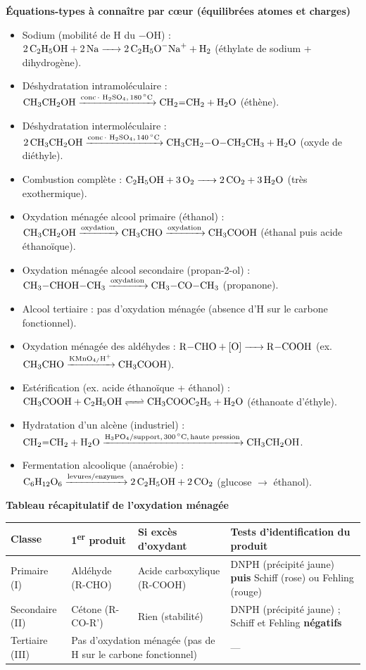 \documentclass[11pt]{article}
\begin{document}
\begin{propriete}
\textbf{Équations-types à connaître par cœur (équilibrées atomes et charges)}
\begin{itemize}
  \item Sodium (mobilité de H du $-\mathrm{OH}$) : $\ce{2C2H5OH + 2Na -> 2C2H5O^-Na^+ + H2}$ (éthylate de sodium + dihydrogène).
  \item Déshydratation intramoléculaire : $\ce{CH3CH2OH ->[{\ce{conc. H2SO4}}, \SI{180}{\celsius}] CH2=CH2 + H2O}$ (éthène).
  \item Déshydratation intermoléculaire : $\ce{2CH3CH2OH ->[{\ce{conc. H2SO4}}, \SI{140}{\celsius}] CH3CH2-O-CH2CH3 + H2O}$ (oxyde de diéthyle).
  \item Combustion complète : $\ce{C2H5OH + 3O2 -> 2CO2 + 3H2O}$ (très exothermique).
  \item Oxydation ménagée alcool primaire (éthanol) : $\ce{CH3CH2OH ->[oxydation] CH3CHO ->[oxydation] CH3COOH}$ (éthanal puis acide éthanoïque).
  \item Oxydation ménagée alcool secondaire (propan-2-ol) : $\ce{CH3-CHOH-CH3 ->[oxydation] CH3-CO-CH3}$ (propanone).
  \item Alcool tertiaire : pas d'oxydation ménagée (absence d'H sur le carbone fonctionnel).
  \item Oxydation ménagée des aldéhydes : $\ce{R-CHO + [O] -> R-COOH}$ (ex. $\ce{CH3CHO ->[KMnO4/H+] CH3COOH}$).
  \item Estérification (ex. acide éthanoïque + éthanol) : $\ce{CH3COOH + C2H5OH <=> CH3COOC2H5 + H2O}$ (éthanoate d'éthyle).
  \item Hydratation d'un alcène (industriel) : $\ce{CH2=CH2 + H2O ->[{\ce{H3PO4}/\text{support}}, \SI{300}{\celsius}, \text{haute pression}] CH3CH2OH}$.
  \item Fermentation alcoolique (anaérobie) : $\ce{C6H12O6 ->[\text{levures/enzymes}] 2C2H5OH + 2CO2}$ (glucose $\to$ éthanol).
\end{itemize}

\textbf{Tableau récapitulatif de l'oxydation ménagée}
\begin{center}
\begin{tabularx}{\linewidth}{|l|X|X|X|}
\hline
\rowcolor{popblueL} \textbf{Classe} & \textbf{1\textsuperscript{er} produit} & \textbf{Si excès d'oxydant} & \textbf{Tests d'identification du produit} \\
\hline
Primaire (I) & Aldéhyde (R-CHO) & Acide carboxylique (R-COOH) & DNPH (précipité jaune) \textbf{puis} Schiff (rose) ou Fehling (rouge) \\
\hline
Secondaire (II) & Cétone (R-CO-R') & Rien (stabilité) & DNPH (précipité jaune) ; Schiff et Fehling \textbf{négatifs} \\
\hline
Tertiaire (III) & \multicolumn{2}{X|}{Pas d'oxydation ménagée (pas de H sur le carbone fonctionnel)} & --- \\
\hline
\end{tabularx}
\end{center}


\end{propriete}
\end{document}
